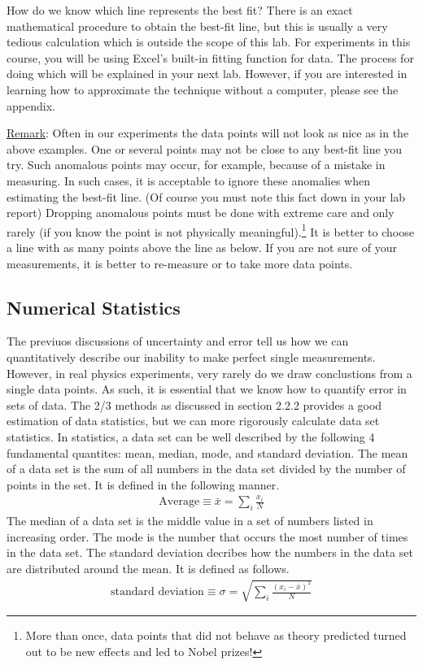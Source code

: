 How do we know which line represents the best fit? There is an exact mathematical procedure to obtain the best-fit line, but this is usually a very tedious calculation which is outside the scope of this lab. For experiments in this course, you will be using Excel's built-in fitting function for data. The process for doing which will be explained in your next lab. However, if you are interested in learning how to approximate the technique without a computer, please see the appendix.\myskip

\underline{Remark}: Often in our experiments the data points will not look as nice as in the above examples. One or several points may not be close to any best-fit line you try. Such anomalous points may occur, for example, because of a mistake in measuring. In such cases, it is acceptable to ignore these anomalies when estimating the best-fit line. (Of course you must note this fact down in your lab report)  Dropping anomalous points must be done with extreme care and only rarely (if you know the point is not physically meaningful).\footnote{More than once, data points that did not behave as theory predicted turned out to be new effects and led to Nobel prizes!}  It is better to choose a line with as many points above the line as below. If you are not sure of your measurements, it is better to re-measure or to take more data points. \myskip

\subsection{Numerical Statistics}
The previuos discussions of uncertainty and error tell us how we can quantitatively describe our inability to make perfect single measurements. However, in real physics experiments, very rarely do we draw conclustions from a single data points. As such, it is essential that we know how to quantify error in sets of data. The 2/3 methods as discussed in section 2.2.2 provides a good estimation of data statistics, but we can more rigorously calculate data set statistics. In statistics, a data set can be well described by the following 4 fundamental quantites: mean, median, mode, and standard deviation. The mean of a data set is the sum of all numbers in the data set divided by the number of points in the set. It is defined in the following manner.
\begin{gather}
 \text{Average} \equiv \bar x= \sum_{i} \frac{x_i}{N}
\end{gather}
The median of a data set is the middle value in a set of numbers listed in increasing order. The mode is the number that occurs the most number of times in the data set. The standard deviation decribes how the numbers in the data set are distributed around the mean. It is defined as follows.
\begin{gather}
\text{standard deviation} \equiv \sigma = \sqrt{\sum_i \frac{(x_i - \bar x)^2}{N}}
\end{gather}

